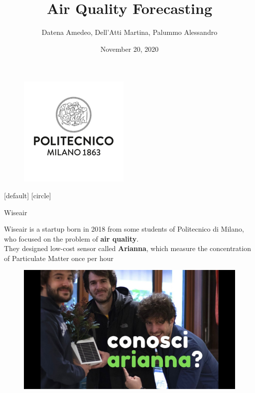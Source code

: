 \documentclass[10pt]{beamer}
\title[Air Quality Forecasting]{Air Quality Forecasting}
\theoremstyle{remark}
\theoremstyle{definition}
\begin{document}
\author[]{Datena Amedeo, Dell'Atti Martina, Palummo Alessandro}
\date{November 20, 2020}

\begin{frame}\maketitle
\begin{figure}[h]
    \centering
    \includegraphics[width=0.2\linewidth]{polimi.jpg}
\end{figure}
\end{frame}


[default]
[circle]


\begin{frame}{Wiseair}

     Wiseair is a startup born in 2018 from some students of Politecnico di Milano, who focused on the problem of \textbf{air quality}.
     \\They designed low-cost sensor called \textbf{Arianna}, which
measure the concentration of Particulate Matter once per hour
    \begin{figure}[h]
	\centering
	\includegraphics[width=0.6\linewidth]{wiseairArrapato.jpg}
\end{figure}
\end{frame}
\end{document}
